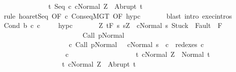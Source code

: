 \begin{isabellebody}
\ \ \ \ \ \ \ \ \ \ \ \ \ \ {\isacharbraceleft}t{\isachardot}\ {\isasymGamma}{\isasymturnstile}{\isasymlangle}Seq\ c{}\ c{}{\isacharcomma}Normal\ Z{\isasymrangle}\ {\isasymRightarrow}\ Abrupt\ t{\isacharbraceright}{\isachardoublequoteclose}\isanewline
\ \ \ \ \isamarkupfalse%
\ {\isacharparenleft}rule\ hoaret{\isachardot}Seq\ {\isacharbrackleft}OF\ c{}\ ConseqMGT\ {\isacharbrackleft}OF\ hyp{\isacharunderscore}c{}{\isacharbrackright}{\isacharbrackright}{\isacharparenright}\isanewline
\ \ \ \ \ \ \ {\isacharparenleft}blast\ intro{\isacharcolon}\ exec{\isachardot}intros{\isacharparenright}\isanewline
{}\isamarkupfalse%
\isanewline
\ \ \isamarkupfalse%
\ {\isacharparenleft}Cond\ b\ c{}\ c{}{\isacharparenright}\ \isanewline
\ \ \isamarkupfalse%
\ hyp{\isacharunderscore}c{}{\isacharcolon}\isanewline
\ \ \ \ \ \ \ {\isachardoublequoteopen}{\isasymforall}Z{\isachardot}\ {\isasymGamma}{\isacharcomma}{\isasymTheta}{\isasymturnstile}\isactrlsub t\isactrlbsub {\isacharslash}F\isactrlesub \ {\isacharbraceleft}s{\isachardot}\ s{\isacharequal}Z\ {\isasymand}\ {\isasymGamma}{\isasymturnstile}{\isasymlangle}c{}{\isacharcomma}Normal\ s{\isasymrangle}\ {\isasymRightarrow}{\isasymnotin}{\isacharparenleft}{\isacharbraceleft}Stuck{\isacharbraceright}\ {\isasymunion}\ Fault\ {\isacharbackquote}\ {\isacharparenleft}{\isacharminus}F{\isacharparenright}{\isacharparenright}\ {\isasymand}\ \isanewline
\ \ \ \ \ \ \ \ \ \ \ \ \ \ \ \ \ \ \ \ \ \ \ \ {\isasymGamma}{\isasymturnstile}Call\ p{\isasymdown}Normal\ {\isasymsigma}\ {\isasymand}\isanewline
\ \ \ \ \ \ \ \ \ \ \ \ \ \ \ \ \ \ \ \ {\isacharparenleft}{\isasymexists}c{\isacharprime}{\isachardot}\ {\isasymGamma}{\isasymturnstile}{\isacharparenleft}Call\ p{\isacharcomma}Normal\ {\isasymsigma}{\isacharparenright}\ {\isasymrightarrow}\isactrlsup {\isacharplus}\ {\isacharparenleft}c{\isacharprime}{\isacharcomma}Normal\ s{\isacharparenright}\ {\isasymand}\ c{}\ {\isasymin}\ redexes\ c{\isacharprime}{\isacharparenright}{\isacharbraceright}\isanewline
\ \ \ \ \ \ \ \ \ \ \ \ \ \ \ \ \ \ \ c{}\ \isanewline
\ \ \ \ \ \ \ \ \ \ \ \ \ \ \ \ \ \ {\isacharbraceleft}t{\isachardot}\ {\isasymGamma}{\isasymturnstile}{\isasymlangle}c{}{\isacharcomma}Normal\ Z{\isasymrangle}\ {\isasymRightarrow}\ Normal\ t{\isacharbraceright}{\isacharcomma}\isanewline
\ \ \ \ \ \ \ \ \ \ \ \ \ \ \ \ \ \ {\isacharbraceleft}t{\isachardot}\ {\isasymGamma}{\isasymturnstile}{\isasymlangle}c{}{\isacharcomma}Normal\ Z{\isasymrangle}\ {\isasymRightarrow}\ Abrupt\ t{\isacharbraceright}{\isachardoublequoteclose}\isanewline

\end{isabellebody}

